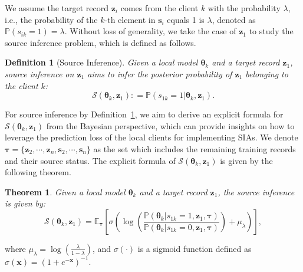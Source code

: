 \documentclass[10pt,journal,compsoc]{IEEEtran}
\newtheorem{definition}{Definition}
\newtheorem{theorem}{Theorem}
\begin{document}
We assume the target record $\bm{z}_i$ comes from the client $k$ with the probability $\lambda$, i.e., the probability of the $k$-th element in $\bm{s}_i$ equals 1 is $\lambda$, denoted as $\mathbb{P}({{s}}_{ik}=1)=\lambda$. Without loss of generality, we take the case of $\bm{z}_1$ to study the source inference problem, which is defined as follows. 

\begin{definition}[Source Inference]\label{definition::sia}
Given a local model $\bm{\theta}_k$ and a target record $\bm{z}_1$, source inference on $\bm{z}_1$ aims to infer the posterior probability of $\bm{z}_1$ belonging to the client $k$:
\begin{equation}
    \mathcal{S}({\bm{\theta}_k},{\bm{z}_1}): = \mathbb{P}({{s}_{1k}} = 1|{\bm{\theta}_k},{\bm{z}_1}).
\end{equation}
\end{definition}

For source inference by Definition~\ref{definition::sia}, we aim to derive an explicit formula for $\mathcal{S}({\bm{\theta}_k},{\bm{z}_1})$ from the Bayesian perspective, which can provide insights on how to leverage the prediction loss of the local clients for implementing SIAs. We denote $\bm{\tau}=\{\bm{z}_2,\cdots,\bm{z}_n,\bm{s}_2,\cdots,\bm{s}_n\}$ as the set which includes the remaining training records and their source status. The explicit formula of $\mathcal{S}({\bm{\theta}_k},{\bm{z}_1})$ is given by the following theorem.

\begin{theorem}
Given a local model $\bm{\theta}_k$ and a target record $\bm{z}_1$, the source inference is given by:
\begin{equation}
    \mathcal{S}({\bm{\theta}_k},{\bm{z}_1}) = {\mathbb{E}_{\bm{\tau}} }\left[ {{\sigma} \left( {\log (\frac{{\mathbb{P}({\bm{\theta} _k}|{{s}_{1k}} = 1,{\bm{z}_1},\bm{\tau} )}}{{\mathbb{P}({\bm{\theta} _k}|{{s}_{1k}} = 0,{\bm{z}_1},\bm{\tau} )}}) + {\mu _\lambda }} \right)} \right],
\end{equation}
\end{theorem}
\noindent where $\mu_{\lambda}=\log (\frac{\lambda }{{1 - \lambda }})$, and ${\sigma}(\cdot)$ is a sigmoid function defined as ${\sigma} (\bm{x}) = {(1 + {e^{ \bm{- x}}})^{ - 1}}$.
\end{document}
